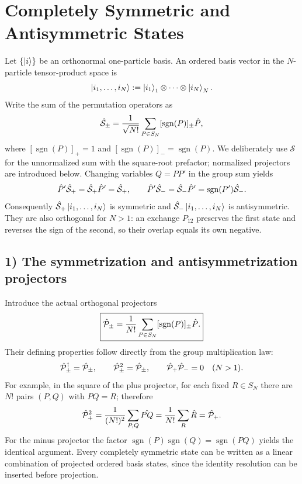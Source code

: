\section{Completely Symmetric and Antisymmetric States}

Let $\{\left|i\right\rangle\}$ be an orthonormal one-particle basis. An ordered basis vector in the $N$-particle tensor-product space is
\begin{equation}
\left|i_1,\ldots,i_N\right\rangle:=\left|i_1\right\rangle_1\otimes\cdots\otimes\left|i_N\right\rangle_N.
\end{equation}
Write the sum of the permutation operators as
\begin{equation}
\hat{\mathcal S}_\pm=\frac1{\sqrt{N!}}
  \sum_{P\in S_N}[\operatorname{sgn}(P)]_\pm\hat{P},
\end{equation}
where $[\operatorname{sgn}(P)]_+=1$ and $[\operatorname{sgn}(P)]_-=\operatorname{sgn}(P)$. We deliberately use $\mathcal S$ for the unnormalized sum with the square-root prefactor; normalized projectors are introduced below. Changing variables $Q=PP'$ in the group sum yields
\begin{equation}
\hat{P}'\hat{\mathcal S}_+=\hat{\mathcal S}_+\hat{P}'=\hat{\mathcal S}_+,
\qquad
\hat{P}'\hat{\mathcal S}_-=\hat{\mathcal S}_-\hat{P}'
 =\operatorname{sgn}(P')\hat{\mathcal S}_-.
\end{equation}
Consequently $\hat{\mathcal S}_+\left|i_1,\ldots,i_N\right\rangle$ is symmetric and $\hat{\mathcal S}_-\left|i_1,\ldots,i_N\right\rangle$ is antisymmetric. They are also orthogonal for $N>1$: an exchange $P_{12}$ preserves the first state and reverses the sign of the second, so their overlap equals its own negative.

\subsection*{1) The symmetrization and antisymmetrization projectors}

Introduce the actual orthogonal projectors
\begin{equation}
\boxed{\hat{\mathcal P}_\pm=\frac1{N!}
    \sum_{P\in S_N}[\operatorname{sgn}(P)]_\pm\hat{P}.}
\end{equation}
Their defining properties follow directly from the group multiplication law:
\begin{equation}
\hat{\mathcal P}_\pm^\dagger=\hat{\mathcal P}_\pm,
\qquad\hat{\mathcal P}_\pm^2=\hat{\mathcal P}_\pm,
\qquad\hat{\mathcal P}_+\hat{\mathcal P}_-=0\quad(N>1).
\end{equation}
For example, in the square of the plus projector, for each fixed $R\in S_N$ there are $N!$ pairs $(P,Q)$ with $PQ=R$; therefore
\begin{equation}
\hat{\mathcal P}_+^2
=\frac1{(N!)^2}\sum_{P,Q}\hat{PQ}
=\frac1{N!}\sum_R\hat{R}=\hat{\mathcal P}_+.
\end{equation}
For the minus projector the factor $\operatorname{sgn}(P)\operatorname{sgn}(Q)=\operatorname{sgn}(PQ)$ yields the identical argument. Every completely symmetric state can be written as a linear combination of projected ordered basis states, since the identity resolution can be inserted before projection.

